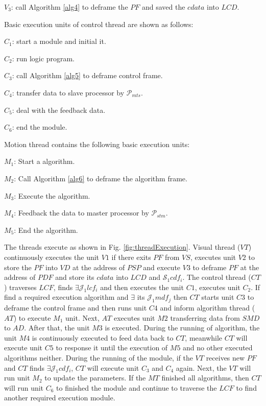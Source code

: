 \documentclass[journal,UTF8]{IEEEtran}
\begin{document}
 \textbf{$V_3$}: call Algorithm \ref{alg4} to deframe the $PF$ and saved the $cdata$ into $LCD$.
 
 Basic execution units of control thread are shown as follows:

\textbf{$C_{1}$}: start a module and initial it.

\textbf{$C_{2}$}: run logic program. 

\textbf{$C_{3}$}: call Algorithm \ref{alg5} to deframe control frame.

\textbf{$C_{4}$}: transfer data to slave processor by $\mathcal{P}_{mts}$.

\textbf{$C_{5}$}: deal with the feedback data.

\textbf{$C_{6}$}: end the module.

Motion thread contains the following basic execution units:

\textbf{$M_{1}$}: Start a algorithm.

\textbf{$M_{2}$}: Call Algorithm \ref{alg6} to deframe the algorithm frame.

\textbf{$M_{3}$}: Execute the algorithm.

\textbf{$M_{4}$}: Feedback the data to master processor by $\mathcal{P}_{stm}$.

\textbf{$M_{5}$}: End the algorithm.

The threads execute as shown in Fig. \ref{fig:threadExecution}. Visual thread ($VT$) continuously executes the unit $V1$ if there exits $PF$ from $VS$, executes unit $V2$ to store the $PF$ into $VD$ at the address of $PSP$ and execute $V3$ to deframe $PF$ at the address of $PDF$ and store its $cdata$ into $LCD$ and $\mathcal{S}_1 {cdf_i}$.
The control thread ($CT$) traverses $LCF$, finds $\exists \mathcal{J}_1 {lcf_i}$ and then executes the unit $C1$, executes unit $C_2$. If find a required execution algorithm and $\exists$ its $\mathcal{J}_1 {mdf_j}$ then $CT$ starts unit $C3$ to deframe the control frame and then runs unit $C4$ and inform algorithm thread ($AT$) to execute $M_1$ unit. Next, $AT$ executes unit $M2$ transferring data from $SMD$ to $AD$. After that, the unit $M3$ is executed. During the running of algorithm, the unit $M4$ is continuously executed to feed data back to $CT$, meanwhile $CT$ will execute unit $C5$ to response it until the execution of $M5$ and no other executed algorithms neither. During the running of the module, if the $VT$ receives new $PF$ and $CT$ finds $\exists \mathcal{J}_1 {cdf_i}$, $CT$ will execute unit $C_3$ and $C_4$ again. Next, the $VT$ will run unit $M_2$ to update the parameters. If the $MT$ finished all algorithms, then $CT$ will run unit $C_6$ to finished the module and continue to traverse the $LCF$ to find another required execution module.   
\end{document}
